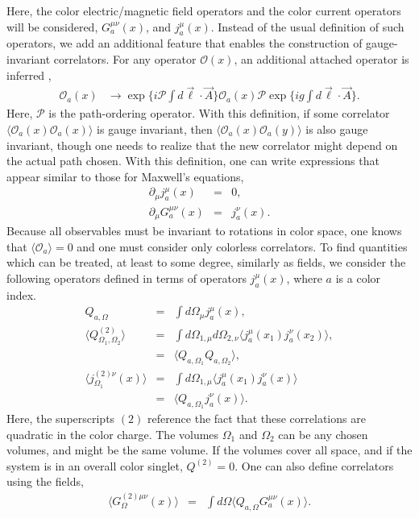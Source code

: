 \documentclass[aps, prc, 12pt, nofootinbib, showpacs, superscriptaddress, tightenlines, groupedaddress]{revtex4-2}
\begin{document}
Here, the color electric/magnetic field operators and the color current operators will be considered, $G^{\mu\nu}_a(x)$, and $j^\mu_a(x)$. Instead of the usual definition of such operators, we add an additional feature that enables the construction of gauge-invariant correlators. For any operator $\mathcal{O}(x)$, an additional attached operator is inferred \cite{Elze:1989un},
\begin{eqnarray}
\mathcal{O}_a(x)&\rightarrow \exp\{i\mathcal{P}\int d\vec{\ell}\cdot\vec{A}\}\mathcal{O}_a(x)\mathcal{P}\exp\{ig\int d\vec{\ell}\cdot\vec{A}\}.
\end{eqnarray}
Here, $\mathcal{P}$ is the path-ordering operator. With this definition, if some correlator $\langle\mathcal{O}_a(x)\mathcal{O}_a(x)\rangle$ is gauge invariant, then $\langle\mathcal{O}_a(x)\mathcal{O}_a(y)\rangle$ is also gauge invariant, though one needs to realize that the new correlator might depend on the actual path chosen. With this definition, one can write expressions that appear similar to those for Maxwell's equations,
\begin{eqnarray}
\partial_\mu j^\mu_a(x)&=&0,\\
\nonumber
\partial_\mu G^{\mu\nu}_a(x)&=&j^\nu_a(x).
\end{eqnarray}
Because all observables must be invariant to rotations in color space, one knows that $\langle\mathcal{O}_a\rangle=0$ and one must consider only colorless correlators. To find quantities which can be treated, at least to some degree, similarly as fields, we consider the following operators defined in terms of operators $j_a^\mu(x)$, where $a$ is a color index. 
\begin{eqnarray}
Q_{a,\Omega}&=&\int d\Omega_\mu j^{\mu}_a(x),\\
\nonumber
\langle Q^{(2)}_{\Omega_1,\Omega_2}\rangle&=&\int d\Omega_{1,\mu}d\Omega_{2,\nu}\langle j^\mu_a(x_1) j^\nu_a(x_2)\rangle,\\
\nonumber
&=&\langle Q_{a,\Omega_1}Q_{a,\Omega_2}\rangle,\\
\nonumber
\langle j^{(2)\nu}_{\Omega_1}(x)\rangle &=&\int d\Omega_{1,\mu} \langle j^\mu_a(x_1) j^\nu_a(x)\rangle\\
\nonumber
&=&\langle Q_{a,\Omega_1}j^\nu_a(x)\rangle.
\end{eqnarray}
Here, the superscripts $(2)$ reference the fact that these correlations are quadratic in the color charge. The volumes $\Omega_1$ and $\Omega_2$ can be any chosen volumes, and might be the same volume. If the volumes cover all space, and if the system is in an overall color singlet, $Q^{(2)}=0$. One can also define correlators using the fields,
\begin{eqnarray}
\langle G^{(2)\mu\nu}_{\Omega}(x)\rangle&=&\int d\Omega\langle Q_{a,\Omega}G^{\mu\nu}_a(x)\rangle.
\end{eqnarray}
\end{document}
